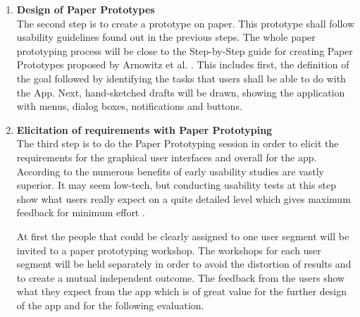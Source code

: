 \begin{enumerate}
	\item \textbf{Design of Paper Prototypes} \\
	The second step is to create a prototype on paper. This prototype shall follow usability guidelines found out in the previous steps. The whole paper prototyping process will be close to the Step-by-Step guide for creating Paper Prototypes proposed by Arnowitz et al. \cite{arnowitz2010effective}. This includes first, the definition of the goal followed by identifying the tasks that users shall be able to do with the App. Next, hand-sketched drafts will be drawn, showing the application with menus, dialog boxes, notifications and buttons.
	
	\item \textbf{Elicitation of requirements with Paper Prototyping} \\
	The third step is to do the Paper Prototyping session in order to elicit the requirements for the graphical user interfaces and overall for the app. According to \cite{lancaster2004paper} the numerous benefits of early usability studies are vastly superior. It may seem low-tech, but conducting usability tests at this step show what users really expect on a quite detailed level which gives maximum feedback for minimum effort \cite{weiss2003handheld}.
	
	At first the people that could be clearly assigned to one user segment will be invited to a paper prototyping workshop. The workshops for each user segment will be held separately in order to avoid the distortion of results and to create a mutual independent outcome. The feedback from the users show what they expect from the app which is of great value for the further design of the app \cite{snyder2003paper} and for the following evaluation.
	
%	
		

\end{enumerate}

